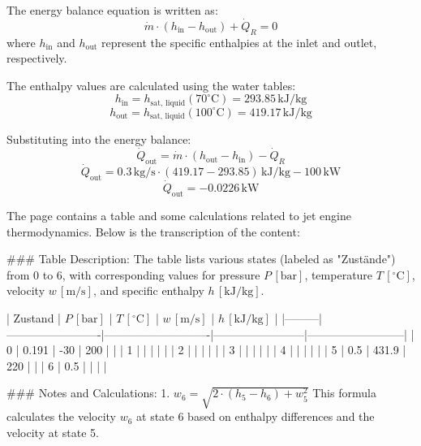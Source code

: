 The energy balance equation is written as:  
\[
\dot{m} \cdot (h_{\text{in}} - h_{\text{out}}) + \dot{Q}_R = 0
\]  
where \( h_{\text{in}} \) and \( h_{\text{out}} \) represent the specific enthalpies at the inlet and outlet, respectively.  

The enthalpy values are calculated using the water tables:  
\[
h_{\text{in}} = h_{\text{sat, liquid}}(70^\circ\text{C}) = 293.85 \, \text{kJ/kg}
\]  
\[
h_{\text{out}} = h_{\text{sat, liquid}}(100^\circ\text{C}) = 419.17 \, \text{kJ/kg}
\]  

Substituting into the energy balance:  
\[
\dot{Q}_{\text{out}} = \dot{m} \cdot (h_{\text{out}} - h_{\text{in}}) - \dot{Q}_R
\]  
\[
\dot{Q}_{\text{out}} = 0.3 \, \text{kg/s} \cdot (419.17 - 293.85) \, \text{kJ/kg} - 100 \, \text{kW}
\]  
\[
\dot{Q}_{\text{out}} = -0.0226 \, \text{kW}
\]

The page contains a table and some calculations related to jet engine thermodynamics. Below is the transcription of the content:

### Table Description:
The table lists various states (labeled as "Zustände") from 0 to 6, with corresponding values for pressure \( P \, [\text{bar}] \), temperature \( T \, [^\circ\text{C}] \), velocity \( w \, [\text{m/s}] \), and specific enthalpy \( h \, [\text{kJ/kg}] \).  

| Zustand | \( P \, [\text{bar}] \) | \( T \, [^\circ\text{C}] \) | \( w \, [\text{m/s}] \) | \( h \, [\text{kJ/kg}] \) |
|---------|-------------------------|----------------------------|------------------------|--------------------------|
| 0       | 0.191                   | -30                        | 200                    |                          |
| 1       |                         |                            |                        |                          |
| 2       |                         |                            |                        |                          |
| 3       |                         |                            |                        |                          |
| 4       |                         |                            |                        |                          |
| 5       | 0.5                     | 431.9                      | 220                    |                          |
| 6       | 0.5                     |                            |                        |                          |

### Notes and Calculations:
1. \( w_6 = \sqrt{2 \cdot \left( h_5 - h_6 \right) + w_5^2} \)  
   This formula calculates the velocity \( w_6 \) at state 6 based on enthalpy differences and the velocity at state 5.  

